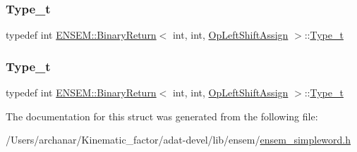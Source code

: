 \mbox{\label{structENSEM_1_1BinaryReturn_3_01int_00_01int_00_01OpLeftShiftAssign_01_4_abe15562b5780c9ed9e3357639d2843ba}} 
\subsubsection{\texorpdfstring{Type\_t}{Type\_t}\hspace{0.1cm}{\footnotesize\ttfamily [2/3]}}
{\footnotesize\ttfamily typedef int \mbox{\hyperlink{structENSEM_1_1BinaryReturn}{E\+N\+S\+E\+M\+::\+Binary\+Return}}$<$ int, int, \mbox{\hyperlink{structENSEM_1_1OpLeftShiftAssign}{Op\+Left\+Shift\+Assign}} $>$\+::\mbox{\hyperlink{structENSEM_1_1BinaryReturn_3_01int_00_01int_00_01OpLeftShiftAssign_01_4_abe15562b5780c9ed9e3357639d2843ba}{Type\+\_\+t}}}

\mbox{\label{structENSEM_1_1BinaryReturn_3_01int_00_01int_00_01OpLeftShiftAssign_01_4_abe15562b5780c9ed9e3357639d2843ba}} 
\subsubsection{\texorpdfstring{Type\_t}{Type\_t}\hspace{0.1cm}{\footnotesize\ttfamily [3/3]}}
{\footnotesize\ttfamily typedef int \mbox{\hyperlink{structENSEM_1_1BinaryReturn}{E\+N\+S\+E\+M\+::\+Binary\+Return}}$<$ int, int, \mbox{\hyperlink{structENSEM_1_1OpLeftShiftAssign}{Op\+Left\+Shift\+Assign}} $>$\+::\mbox{\hyperlink{structENSEM_1_1BinaryReturn_3_01int_00_01int_00_01OpLeftShiftAssign_01_4_abe15562b5780c9ed9e3357639d2843ba}{Type\+\_\+t}}}



The documentation for this struct was generated from the following file\+:\begin{DoxyCompactItemize}
\item 
/\+Users/archanar/\+Kinematic\+\_\+factor/adat-\/devel/lib/ensem/\mbox{\hyperlink{adat-devel_2lib_2ensem_2ensem__simpleword_8h}{ensem\+\_\+simpleword.\+h}}\end{DoxyCompactItemize}
